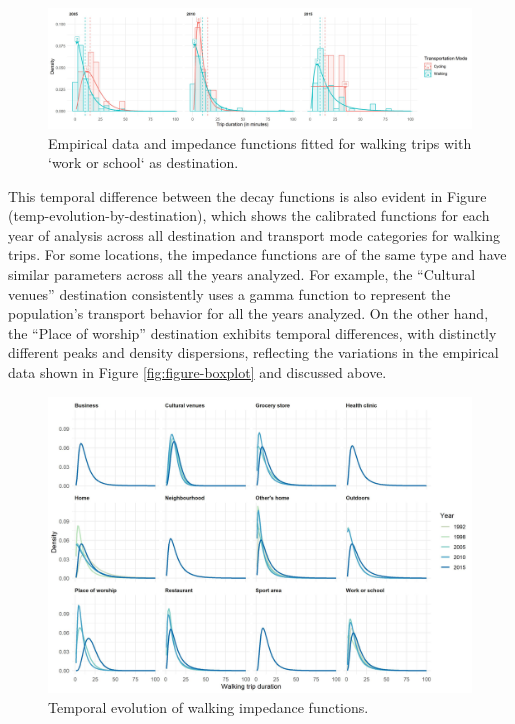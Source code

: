 \documentclass[preprint, 3p,
authoryear]{elsarticle} %
\begin{document}
\begin{figure}

{\centering \includegraphics[width=1\linewidth]{figures/impf_Outdoors} 

}

\caption{Empirical data and impedance functions fitted for walking trips with `work or school` as destination.}\label{fig:outdoors-impedance-fig}
\end{figure}

This temporal difference between the decay functions is also evident in
Figure (temp-evolution-by-destination), which shows the calibrated
functions for each year of analysis across all destination and transport
mode categories for walking trips. For some locations, the impedance
functions are of the same type and have similar parameters across all
the years analyzed. For example, the ``Cultural venues'' destination
consistently uses a gamma function to represent the population's
transport behavior for all the years analyzed. On the other hand, the
``Place of worship'' destination exhibits temporal differences, with
distinctly different peaks and density dispersions, reflecting the
variations in the empirical data shown in Figure
\ref{fig:figure-boxplot} and discussed above.

\begin{figure}

{\centering \includegraphics[width=1\linewidth]{figures/walking_temporal_evolution} 

}

\caption{Temporal evolution of walking impedance functions.}\label{fig:walking-evolution-fig}
\end{figure}
\end{document}
